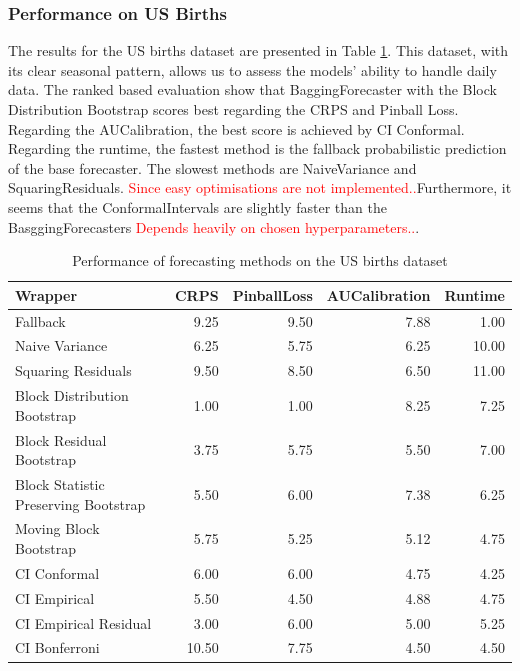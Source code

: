 \documentclass{article}
\begin{document}
\subsubsection{Performance on US Births}
The results for the US births dataset are presented in Table \ref{table:us_births_results}. This dataset, with its clear seasonal pattern, allows us to assess the models' ability to handle daily data.
The ranked based evaluation show that BaggingForecaster with the Block Distribution Bootstrap scores best regarding the CRPS and Pinball Loss. 
Regarding the AUCalibration, the best score is achieved by CI Conformal. Regarding the runtime, the fastest method is the fallback probabilistic prediction of the base forecaster. The slowest methods are NaiveVariance and SquaringResiduals. 
\textcolor{red}{Since easy optimisations are not implemented..}Furthermore, it seems that the ConformalIntervals are slightly faster than the BasggingForecasters \textcolor{red}{Depends heavily on chosen hyperparameters..}. 

\begin{table}[h]
    \centering
    \caption{Performance of forecasting methods on the US births dataset}
    \label{table:us_births_results}
\begin{tabular}{lrrrr}
\toprule
Wrapper & CRPS & PinballLoss & AUCalibration & Runtime \\
\midrule
Fallback & 9.25 & 9.50 & 7.88 & 1.00 \\
Naive Variance & 6.25 & 5.75 & 6.25 & 10.00 \\
Squaring Residuals & 9.50 & 8.50 & 6.50 & 11.00 \\
Block Distribution Bootstrap & 1.00 & 1.00 & 8.25 & 7.25 \\
Block Residual Bootstrap & 3.75 & 5.75 & 5.50 & 7.00 \\
Block Statistic Preserving Bootstrap & 5.50 & 6.00 & 7.38 & 6.25 \\
Moving Block Bootstrap & 5.75 & 5.25 & 5.12 & 4.75 \\
CI Conformal & 6.00 & 6.00 & 4.75 & 4.25 \\
CI Empirical & 5.50 & 4.50 & 4.88 & 4.75 \\
CI Empirical Residual & 3.00 & 6.00 & 5.00 & 5.25 \\
CI Bonferroni  & 10.50 & 7.75 & 4.50 & 4.50 \\
\bottomrule
\end{tabular}

\end{table}
\end{document}
